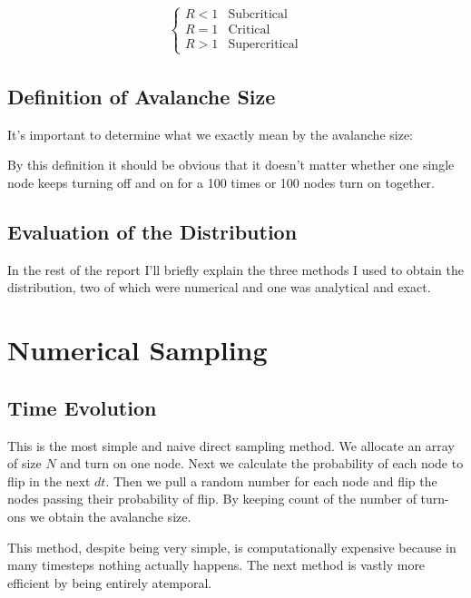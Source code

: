 \documentclass{article}
\begin{document}
\begin{gather}
  \begin{cases}
    R < 1 & \text{Subcritical}\\
    R = 1 & \text{Critical}\\
    R > 1 & \text{Supercritical}
  \end{cases}
\end{gather}
\subsection{Definition of Avalanche Size}
\label{sec:orgd13b5c1}

It's important to determine what we exactly mean by the avalanche
size:

\begin{center}
\end{center}

By this definition it should be obvious that it doesn't matter whether
one single node keeps turning off and on for a 100 times or 100 nodes
turn on together.
\subsection{Evaluation of the Distribution}
\label{sec:orgff09d6d}

In the rest of the report I'll briefly explain the three methods I
used to obtain the distribution, two of which were numerical and one
was analytical and exact.
\section{Numerical Sampling}
\label{sec:orga50d05c}

\subsection{Time Evolution}
\label{sec:org51c520d}

This is the most simple and naive direct sampling method. We allocate
an array of size \(N\) and turn on one node. Next we calculate the
probability of each node to flip in the next \(dt\). Then we pull a
random number for each node and flip the nodes passing their
probability of flip. By keeping count of the number of turn-ons we
obtain the avalanche size.

This method, despite being very simple, is computationally expensive
because in many timesteps nothing actually happens. The next method is
vastly more efficient by being entirely atemporal.
\end{document}
